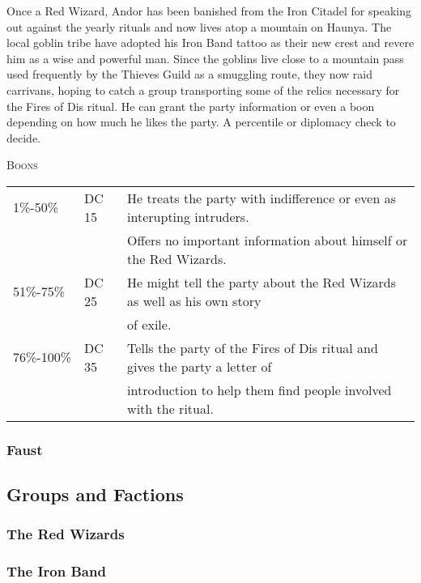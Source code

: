 		Once a Red Wizard, Andor has been banished from the Iron Citadel
		for speaking out against the yearly rituals and now lives atop
		a mountain on Haunya.  The local goblin tribe have adopted his
		Iron Band tattoo as their new crest and revere him as a wise 
		and powerful man.  Since the goblins live close to a mountain
		pass used frequently by the Thieves Guild as a smuggling route,
		they now raid carrivans, hoping to catch a group transporting
		some of the relics necessary for the Fires of Dis ritual.  He
		can grant the party information or even a boon depending on how
		much he likes the party.  A percentile or diplomacy 
		check to decide. 

		\textsc{Boons}

		\begin{tabularx}{\textwidth}{| X | X | X |}
			\hline
			1\%-50\% & DC 15 & He treats the party with indifference 
						or even as interupting intruders. \\
 					& & Offers no important information about 
						himself or the Red Wizards. \\
			\hline
			51\%-75\% & DC 25 & He might tell the party about the Red
						Wizards as well as his own story \\ 
					& & 	of exile. \\
			\hline	
			76\%-100\% & DC 35 & Tells the party of the Fires of Dis 
						ritual and gives the party a letter of \\
					& &	introduction to help them find people 
						involved with the ritual. \\ 		
			\hline
		\end{tabularx}

		\subsubsection{Faust}

	\subsection{Groups and Factions}

		\subsubsection{The Red Wizards}

		\subsubsection{The Iron Band}
